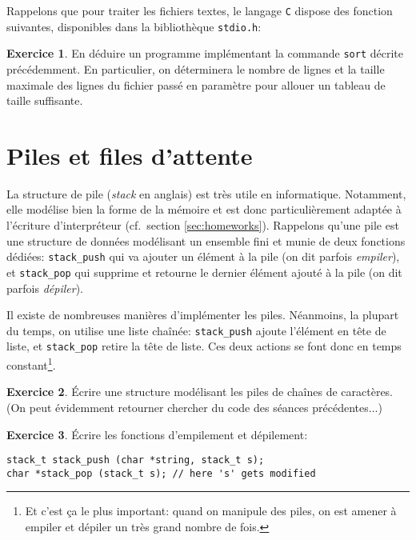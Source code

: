 \documentclass[french,a4paper]{article}
\theoremstyle{definition}
\newtheorem{exercise}{Exercice}
\theoremstyle{remark}
\newcommand{\shell}[1]{\lstinline[style={},style=sh]|#1|}
\newcommand{\inlinec}[1]{\lstinline[style=C]°#1°}
\begin{document}
Rappelons que pour traiter les fichiers textes, le langage {\tt C}
dispose des fonction suivantes, disponibles dans la bibliothèque
\inlinec{stdio.h}: 

\begin{exercise}
  En déduire un programme implémentant la commande \shell{sort}
  décrite précédemment. En particulier, on déterminera le nombre de
  lignes et la taille maximale des lignes du fichier passé en
  paramètre pour allouer un tableau de taille suffisante.
\end{exercise}

\section{Piles et files d'attente}
\label{sec:stack}

La structure de pile ({\em stack} en anglais) est très utile en
informatique. Notamment, elle modélise bien la forme de la mémoire et
est donc particulièrement adaptée à l'écriture d'interpréteur (cf.\
section \ref{sec:homeworks}). Rappelons qu'une pile est une structure
de données modélisant un ensemble fini et munie de deux fonctions
dédiées: \inlinec{stack_push} qui va ajouter un élément à la pile (on
dit parfois {\em empiler}), et \inlinec{stack_pop} qui supprime et
retourne le dernier élément ajouté à la pile (on dit parfois {\em
  dépiler}).

Il existe de nombreuses manières d'implémenter les piles. Néanmoins,
la plupart du temps, on utilise une liste chaînée:
\inlinec{stack_push} ajoute l'élément en tête de liste, et
\inlinec{stack_pop} retire la tête de liste. Ces deux actions se font
donc en temps constant\footnote{Et c'est ça le plus important: quand
  on manipule des piles, on est amener à empiler et dépiler un très
  grand nombre de fois.}.

\begin{exercise}
  \'Ecrire une structure modélisant les piles de chaînes de
  caractères. (On peut évidemment retourner chercher du code des
  séances précédentes...)
\end{exercise}

\begin{exercise}
  \'Ecrire les fonctions d'empilement et dépilement:
  \begin{lstlisting}
stack_t stack_push (char *string, stack_t s);
char *stack_pop (stack_t s); // here 's' gets modified
  \end{lstlisting}
\end{exercise}
\end{document}
